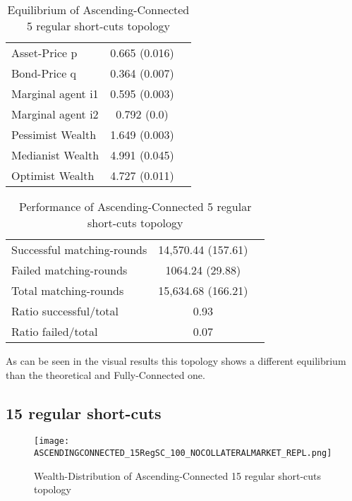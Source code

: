 \documentclass[Bachelorarbeit.tex]{subfiles}
\begin{document}
\begin{table}[H]
	\caption{Equilibrium of Ascending-Connected 5 regular short-cuts topology}
	\centering
	\begin{tabular} { l c r }
		\hline
		Asset-Price p & 0.665 (0.016) \\
		Bond-Price q & 0.364 (0.007) \\
		Marginal agent i1 & 0.595 (0.003) \\
		Marginal agent i2 & 0.792 (0.0) \\
		\hline
		Pessimist Wealth & 1.649 (0.003) \\
		Medianist Wealth & 4.991 (0.045) \\
		Optimist Wealth & 4.727 (0.011) \\
		\hline
	\end{tabular}
\end{table} 

\begin{table}[H]
	\caption{Performance of Ascending-Connected 5 regular short-cuts topology}
	\centering
	\begin{tabular} { l c r }
		\hline
		Successful matching-rounds& 14,570.44 (157.61) \\
		Failed matching-rounds & 1064.24 (29.88) \\
		Total matching-rounds & 15,634.68 (166.21) \\
		\hline
		Ratio successful/total & 0.93 \\
		Ratio failed/total & 0.07 \\
		\hline
	\end{tabular}
\end{table}

As can be seen in the visual results this topology shows a different equilibrium than the theoretical and Fully-Connected one.

\subsection{15 regular short-cuts}
\begin{figure}[H]
	\centering
  \texttt{[image: ASCENDINGCONNECTED\_15RegSC\_100\_NOCOLLATERALMARKET\_REPL.png]}
	\caption{Wealth-Distribution of Ascending-Connected 15 regular short-cuts topology}
	\label{fig:wealth_ASCENDINGCONNECTED_15RegSC_100_NOCOLLATERALMARKET_REPL}
\end{figure}
\end{document}

